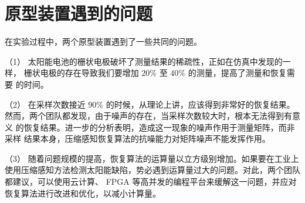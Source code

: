 \section{原型装置遇到的问题}

在实验过程中，两个原型装置遇到了一些共同的问题。

（1） 太阳能电池的栅状电极破坏了测量结果的稀疏性，正如在仿真中发现的一样，
栅状电极的存在导致我们要增加 $20\%$ 至 $40\%$ 的测量，提高了测量和恢复需要
的时间。

（2） 在采样次数接近 $90\%$ 的时候，从理论上讲，应该得到非常好的恢复结果。
然而，两个团队都发现，由于噪声的存在，当采样次数较大时，根本无法得到有意义
的恢复结果。进一步的分析表明，造成这一现象的噪声作用于测量矩阵，而非采样
结果本身，压缩感知恢复算法的抗噪能力对矩阵噪声不能发挥作用。

（3） 随着问题规模的提高，恢复算法的运算量以立方级别增加。如果要在工业上
使用压缩感知方法检测太阳能缺陷，势必遇到运算量过大的问题。对此，两个团队
都建议，可以使用云计算、 FPGA 等高并发的编程平台来缓解这一问题，并应对
恢复算法进行改进和优化，以减小计算量。

